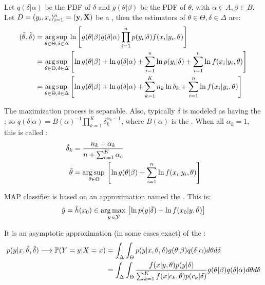 Let $q(\delta|\alpha)$ be the PDF of $\delta$ and $g(\theta|\beta)$ be the PDF of $\theta$, with  $\alpha\in A, \beta\in B$. Let $D=(y_i,x_i)_{i=1}^n=(\vb{y},\vb{X})$ be a , then the  estimators of $\theta\in\Theta, \delta\in\Delta$ are:
\begin{align*}
    (\Tilde{\theta}, \Tilde{\delta}) 
    &= \operatorname*{arg\,sup\,}_{\theta\in\Theta, \delta\in\Delta} \ln\left[g(\theta|\beta)q(\delta|\alpha) \prod_{i=1}^np(y_i|\delta) f(x_i|y_i,\theta) \right]\\
    &= \operatorname*{arg\,sup\,}_{\theta\in\Theta, \delta\in\Delta} \left[\ln g(\theta|\beta)+\ln q(\delta|\alpha)+\sum_{i=1}^n\ln p(y_i|\delta)+\sum_{i=1}^n\ln f(x_i|y_i,\theta)\right]
    \\
    &= \operatorname*{arg\,sup\,}_{\theta\in\Theta, \delta\in\Delta} \left[\ln g(\theta|\beta)+\ln q(\delta|\alpha)+\sum_{k=1}^Kn_k\ln \delta_k+\sum_{i=1}^n\ln f(x_i|y_i,\theta)\right]
\end{align*}

The maximization process is separable. Also, typically $\delta$ is modeled as having the ; so $q(\delta|\alpha)=B(\alpha)^{-1}\prod_{k=1}^K \delta_k^{\alpha_k-1}$, where $B(\alpha)$ is the . When all $\alpha_k=1$, this is called :
\begin{align*}
    \Tilde{\delta}_k &= \frac{n_k+\alpha_k}{n+\sum_{c=1}^K\alpha_c} \\
    \Tilde{\theta} &= \operatorname*{arg\,sup\,}_{\theta\in\Theta} \left[\ln g(\theta|\beta)+\sum_{i=1}^n\ln f(x_i|y_i,\theta)\right]
\end{align*}

MAP classifier is based on an approximation named the . This is:
\begin{equation*}
    \hat{y}=\hat{h}(x_0) \in \operatorname*{arg\,max\,}_{y\,\in\mathcal{Y}}\left[ \ln p(y|\Tilde{\delta})+\ln f(x_0|y,\Tilde{\theta})\right]
\end{equation*}

It is an asymptotic approximation (in some cases exact) of the :
\begin{align*}
   p(y|x,\Tilde{\theta},\Tilde{\delta}) \longrightarrow \operatorname{\mathbb{P}}(Y=y|X=x) &= \int_{\Delta}\int_{\Theta}p(y|x,\theta,\delta)g(\theta|\beta)q(\delta|\alpha)d\theta d\delta\\ &= \int_{\Delta}\int_{\Theta}\frac{f(x|y,\theta)p(y|\delta)}{\sum_{k=1}^K f(x|c_k,\theta)p(c_k|\delta)}g(\theta|\beta)q(\delta|\alpha)d\theta d\delta
\end{align*}

